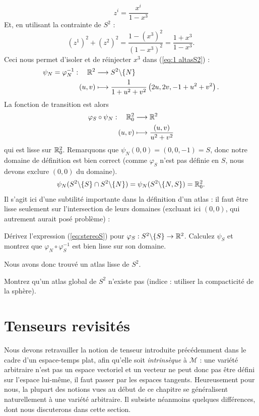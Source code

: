 \begin{equation}
\label{eq:1 altasS2}
    z^i = \frac{x^i}{1-x^3}
\end{equation}
Et, en utilisant la contrainte de $S^2$ :
\begin{equation}
    (z^1)^2 + (z^2)^2 = \frac{1 - (x^3)^2}{(1-x^3)^2} = \frac{1 + x^3}{1-x^3}.
\end{equation}
Ceci nous permet d'isoler et de réinjecter $x^3$ dans (\ref{eq:1 altasS2}) :
\begin{align*}
    \psi_N = \varphi_N^{-1}: \quad \mathbb{R}^2 &\longrightarrow S^2\backslash \{N\}\\
    (u,v) &\longmapsto \frac{1}{1+u^2 +v^2} \left( 2 u,2v, -1 + u^2+v^2 \right).
\end{align*}
La fonction de transition est alors
\begin{align*}
    \varphi_S \circ \psi_N :\quad \mathbb{R}^2_0 &\longrightarrow \mathbb{R}^2\\
    (u,v) &\longmapsto \frac{(u,v)}{u^2+v^2}
\end{align*}
qui est lisse sur $\mathbb{R}^2_0$. Remarquons que $\psi_N(0,0) = (0,0,-1)=S$, donc notre domaine de définition est bien correct (comme $\varphi_S$ n'est pas définie en $S$, nous devons exclure $(0,0)$ du domaine).
\begin{align}
    \psi_N ( S^2\backslash\{S\} \cap S^2\backslash\{N\}) = \psi_N ( S^2\backslash\{N,S\}) = \mathbb{R}^2_0.
\end{align}
Il s'agit ici d'une subtilité importante dans la définition d'un atlas : il faut être lisse seulement sur l'intersection de leurs domaines (excluant ici $(0,0)$, qui autrement aurait posé problème) :
\begin{exerc}
    Dérivez l'expression (\ref{eq:stereoS}) pour $\varphi_S : S^2\backslash \{ S\} \to \mathbb{R}^2$. Calculez $\psi_S$ et montrez que $\varphi_N \circ \varphi_S^{-1}$ est bien lisse sur son domaine. 
\end{exerc}
Nous avons donc trouvé un atlas lisse de $S^2$.
\begin{exerc}
    Montrez qu'un atlas global de $S^2$ n'existe pas (indice : utiliser la compacticité de la sphère).
\end{exerc}
\section{Tenseurs revisités}
\label{sec:tenseurs variétés}
Nous devons retravailler la notion de tenseur introduite précédemment dans le cadre d'un espace-temps plat, afin qu'elle soit \emph{intrinsèque} à $\mathcal{M}$ : une variété arbitraire n'est pas un espace vectoriel et un vecteur ne peut donc pas être défini sur l'espace lui-même, il faut passer par les espaces tangents. Heureusement pour nous, la plupart des notions vues au début de ce chapitre se généralisent naturellement à une variété arbitraire. Il subsiste néanmoins quelques différences, dont nous discuterons dans cette section. 
